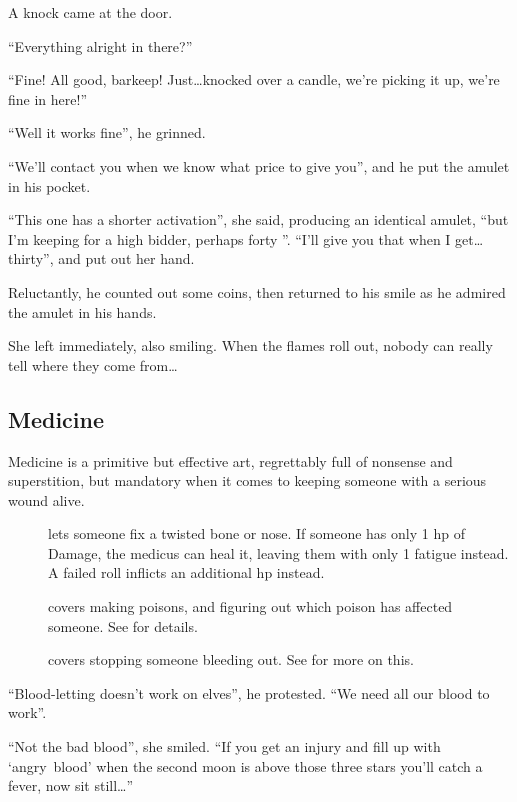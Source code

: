 \begin{multicols}{2}
\begin{exampletext}
  A knock came at the door.

  ``Everything alright in there?''

  ``Fine!
  All good, barkeep!
  Just\ldots knocked over a candle, we're picking it up, we're fine in here!''

  ``Well it works fine'', he grinned.

  ``We'll contact you when we know what price to give you'', and he put the amulet in his pocket.

  ``This one has a shorter activation'', she said, producing an identical amulet, ``but I'm keeping for a high bidder, perhaps forty ''.
  ``I'll give you that when I get\ldots thirty'', and put out her hand.

  Reluctantly, he counted out some coins, then returned to his smile as he admired the amulet in his hands.

  She left immediately, also smiling.
  When the flames roll out, nobody can really tell where they come from\ldots
\end{exampletext}

\subsection{Medicine}

Medicine is a primitive but effective art, regrettably full of nonsense and superstition, but mandatory when it comes to keeping someone with a serious wound alive.

\begin{description}
  \item[]
    lets someone fix a twisted bone or nose.
    If someone has only 1 \gls{hp} of Damage, the medicus can heal it, leaving them with only 1 \gls{fatigue} instead.
    A failed roll inflicts an additional \gls{hp} instead.
  \item[]
    covers making poisons, and figuring out which poison has affected someone.
    See  for details.
  \item[]
    covers stopping someone bleeding out.
    See  for more on this.
\end{description}

\begin{exampletext}
  ``Blood-letting doesn't work on elves'', he protested.
  ``We need all our blood to work''.

  ``Not the bad blood'', she smiled.
  ``If you get an injury and fill up with `angry~blood' when the second moon is above those three stars you'll catch a fever, now sit still\ldots''
\end{exampletext}


\end{multicols}
